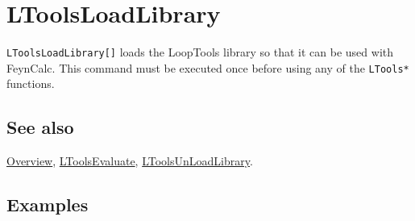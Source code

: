 \documentclass[../FeynHelpersManual.tex]{subfiles}
\begin{document}
\hypertarget{ltoolsloadlibrary}{
\section{LToolsLoadLibrary}\label{ltoolsloadlibrary}}

\texttt{LToolsLoadLibrary[\allowbreak{}]} loads the LoopTools library so
that it can be used with FeynCalc. This command must be executed once
before using any of the \texttt{LTools*} functions.

\subsection{See also}

\hyperlink{toc}{Overview}, \hyperlink{ltoolsevaluate}{LToolsEvaluate},
\hyperlink{ltoolsunloadlibrary}{LToolsUnLoadLibrary}.

\subsection{Examples}
\end{document}
